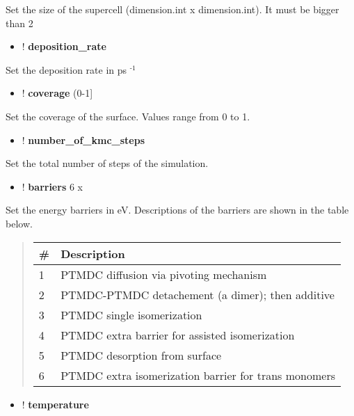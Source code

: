 \documentclass[letterpaper,10pt,english]{sphinxmanual}
\begin{document}
Set the size of the supercell (dimension.int x dimension.int). It must be
bigger than 2
\begin{itemize}
\item {} 
! \textbf{deposition\_rate} 

\end{itemize}

Set the deposition rate in ps $^{\text{-1}}$
\begin{itemize}
\item {} 
! \textbf{coverage}   (0-1{]}

\end{itemize}

Set the coverage of the surface. Values range from 0 to 1.
\begin{itemize}
\item {} 
! \textbf{number\_of\_kmc\_steps} 

\end{itemize}

Set the total number of steps of the simulation.
\begin{itemize}
\item {} 
! \textbf{barriers} 6 x 

\end{itemize}

Set the energy barriers in eV. Descriptions of the barriers are shown in the table
below.
\begin{quote}

\begin{tabulary}{\linewidth}{|L|L|}
\hline
\textbf{
\#
} & \textbf{
Description
}\\\hline

1
 & 
PTMDC diffusion via pivoting mechanism
\\\hline

2
 & 
PTMDC-PTMDC detachement (a dimer); then additive
\\\hline

3
 & 
PTMDC single isomerization
\\\hline

4
 & 
PTMDC extra barrier for assisted isomerization
\\\hline

5
 & 
PTMDC desorption from surface
\\\hline

6
 & 
PTMDC extra isomerization barrier for trans monomers
\\\hline
\end{tabulary}

\end{quote}
\begin{itemize}
\item {} 
! \textbf{temperature} 

\end{itemize}
\end{document}

